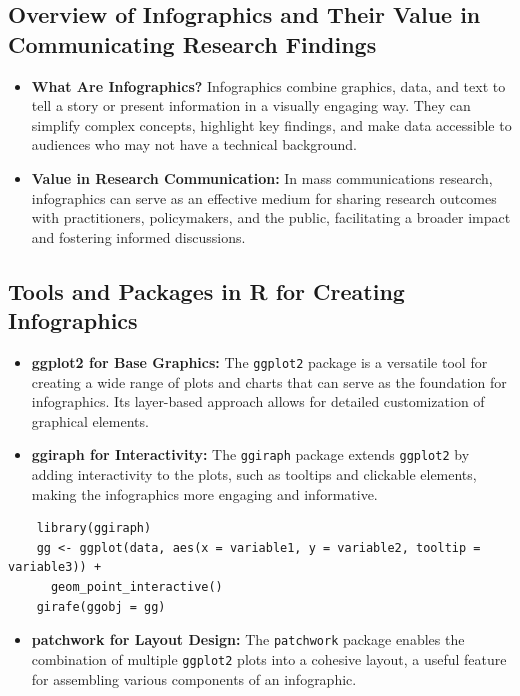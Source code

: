 \documentclass[
]{book}
\providecommand{\tightlist}{%
  \setlength{\itemsep}{0pt}\setlength{\parskip}{0pt}}
\begin{document}
\subsection{Overview of Infographics and Their Value in Communicating Research Findings}\label{overview-of-infographics-and-their-value-in-communicating-research-findings}

\begin{itemize}
\item
  \textbf{What Are Infographics?} Infographics combine graphics, data, and text to tell a story or present information in a visually engaging way. They can simplify complex concepts, highlight key findings, and make data accessible to audiences who may not have a technical background.
\item
  \textbf{Value in Research Communication:} In mass communications research, infographics can serve as an effective medium for sharing research outcomes with practitioners, policymakers, and the public, facilitating a broader impact and fostering informed discussions.
\end{itemize}

\subsection{Tools and Packages in R for Creating Infographics}\label{tools-and-packages-in-r-for-creating-infographics}

\begin{itemize}
\item
  \textbf{ggplot2 for Base Graphics:} The \texttt{ggplot2} package is a versatile tool for creating a wide range of plots and charts that can serve as the foundation for infographics. Its layer-based approach allows for detailed customization of graphical elements.
\item
  \textbf{ggiraph for Interactivity:} The \texttt{ggiraph} package extends \texttt{ggplot2} by adding interactivity to the plots, such as tooltips and clickable elements, making the infographics more engaging and informative.
\end{itemize}

\begin{verbatim}
    library(ggiraph)
    gg <- ggplot(data, aes(x = variable1, y = variable2, tooltip = variable3)) + 
      geom_point_interactive() 
    girafe(ggobj = gg)
\end{verbatim}

\begin{itemize}
\tightlist
\item
  \textbf{patchwork for Layout Design:} The \texttt{patchwork} package enables the combination of multiple \texttt{ggplot2} plots into a cohesive layout, a useful feature for assembling various components of an infographic.
\end{itemize}
\end{document}
